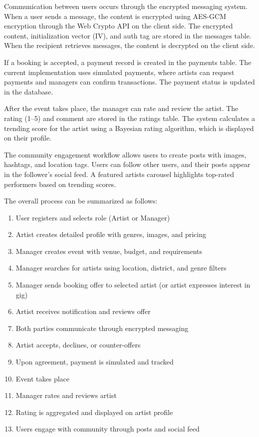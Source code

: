 \documentclass[12pt,a4paper]{report}
\begin{document}
Communication between users occurs through the encrypted messaging system. When a user sends a message, the content is encrypted using AES-GCM encryption through the Web Crypto API on the client side. The encrypted content, initialization vector (IV), and auth tag are stored in the messages table. When the recipient retrieves messages, the content is decrypted on the client side.

If a booking is accepted, a payment record is created in the payments table. The current implementation uses simulated payments, where artists can request payments and managers can confirm transactions. The payment status is updated in the database.

After the event takes place, the manager can rate and review the artist. The rating (1--5) and comment are stored in the ratings table. The system calculates a trending score for the artist using a Bayesian rating algorithm, which is displayed on their profile.

The community engagement workflow allows users to create posts with images, hashtags, and location tags. Users can follow other users, and their posts appear in the follower's social feed. A featured artists carousel highlights top-rated performers based on trending scores.

The overall process can be summarized as follows:

\begin{enumerate}
\item User registers and selects role (Artist or Manager)
\item Artist creates detailed profile with genres, images, and pricing
\item Manager creates event with venue, budget, and requirements
\item Manager searches for artists using location, district, and genre filters
\item Manager sends booking offer to selected artist (or artist expresses interest in gig)
\item Artist receives notification and reviews offer
\item Both parties communicate through encrypted messaging
\item Artist accepts, declines, or counter-offers
\item Upon agreement, payment is simulated and tracked
\item Event takes place
\item Manager rates and reviews artist
\item Rating is aggregated and displayed on artist profile
\item Users engage with community through posts and social feed
\end{enumerate}
\end{document}
